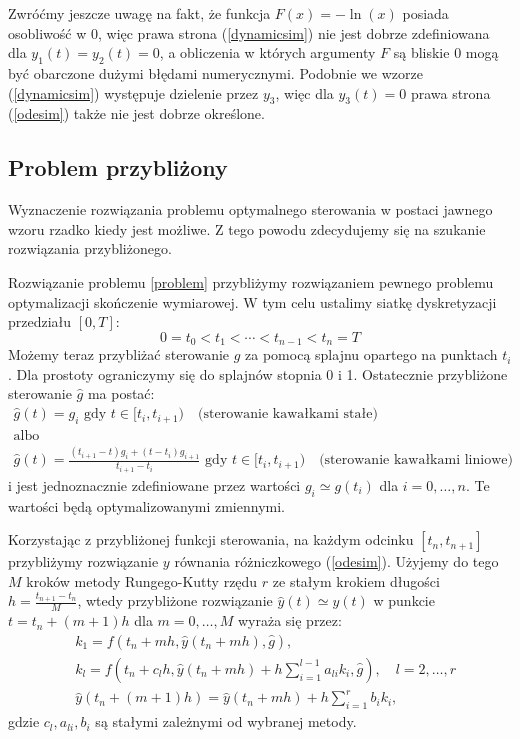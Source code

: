 \documentclass[11pt]{article}
\begin{document}
Zwróćmy jeszcze uwagę na fakt, że funkcja $F(x) = -\ln(x)$ posiada osobliwość w 0, więc prawa strona (\ref{dynamicsim}) nie jest dobrze zdefiniowana dla $y_1(t) = y_2(t) = 0$, a obliczenia w których argumenty $F$ są bliskie 0 mogą być obarczone dużymi błędami numerycznymi. Podobnie we wzorze (\ref{dynamicsim}) występuje dzielenie przez $y_3$, więc dla $y_3(t) = 0$ prawa strona (\ref{odesim}) także nie jest dobrze określone.

\subsection{Problem przybliżony}
Wyznaczenie rozwiązania problemu optymalnego sterowania w postaci jawnego wzoru rzadko kiedy jest możliwe. Z tego powodu zdecydujemy się na szukanie rozwiązania przybliżonego.

Rozwiązanie problemu \ref{problem} przybliżymy rozwiązaniem pewnego problemu optymalizacji skończenie wymiarowej. W tym celu ustalimy siatkę dyskretyzacji przedziału $[0, T]$:
\begin{equation}
  0 = t_0 < t_1 < \cdots < t_{n-1} < t_n = T
\end{equation}
Możemy teraz przybliżać sterowanie $g$ za pomocą splajnu opartego na punktach $t_{i}$. Dla prostoty ograniczymy się do splajnów stopnia 0 i 1. Ostatecznie przybliżone sterowanie $\hat{g}$ ma postać:
\begin{gather}  
    \hat{g}(t) = g_i \text{ gdy } t \in [t_{i}, t_{i + 1}) \quad \text{(sterowanie kawałkami stałe)} \label{control_1}\\
    \nonumber \text{albo} \\
    \hat{g}(t) = \frac{(t_{i+1} - t)g_i + (t - t_i)g_{i+1}}{t_{i+1} - t_i} \text{ gdy } t \in [t_i, t_{i+1}) \quad \text{(sterowanie kawałkami liniowe)} \label{control_2}
\end{gather}
i jest jednoznacznie zdefiniowane przez wartości $g_i \simeq g(t_i)$ dla $i = 0,\ldots, n$. Te wartości będą optymalizowanymi zmiennymi.

Korzystając z przybliżonej funkcji sterowania, na każdym odcinku $[t_n, t_{n+1}]$ przybliżymy rozwiązanie $y$ równania różniczkowego (\ref{odesim}). Użyjemy do tego $M$ kroków metody Rungego-Kutty rzędu $r$ ze stałym krokiem długości $h = \frac{t_{n+1} - t_n}{M}$, wtedy przybliżone rozwiązanie $\hat{y}(t) \simeq y(t)$ w punkcie $t = t_n + (m + 1)h$ dla $m = 0,\ldots, M$  wyraża się przez:
\begin{equation} \label{rk}
  \begin{split}
    &k_1 = f(t_n + mh, \hat{y}(t_n + mh), \hat{g}), \\
    &k_l = f(t_n + c_l h, \hat{y}(t_n + mh) + h \sum_{i = 1}^{l-1} a_{li}k_i, \hat{g}),\quad l = 2,\ldots, r \\
    &\hat{y}(t_n + (m+1)h) = \hat{y}(t_n + mh) + h \sum_{i = 1}^r b_i k_i,
  \end{split}
\end{equation}
gdzie $c_l, a_{li}, b_i$ są stałymi zależnymi od wybranej metody.
\end{document}
